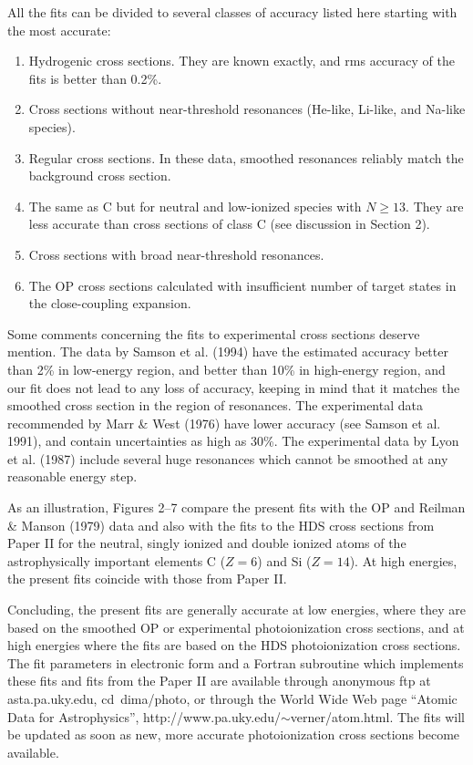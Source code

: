 All the fits can be divided to several classes of accuracy listed here
starting with the most accurate:
\begin{enumerate}
\item[A.] Hydrogenic cross sections. They are known
exactly, and rms accuracy of the fits is better than 0.2\%.
\item[B.] Cross sections without near-threshold resonances (He-like, Li-like,
and Na-like species).
\item[C.] Regular cross sections. In these data,
smoothed resonances reliably match the background cross section.
\item[D.] The same as C but for neutral and low-ionized species with 
$N \ge 13$. They are less accurate
than cross sections of class C (see discussion in Section 2).
\item[E.] Cross sections with broad near-threshold resonances.
\item[F.] The OP cross sections calculated with insufficient number of
target states in the close-coupling expansion.
\end{enumerate}
Some comments concerning the fits to experimental
cross sections
deserve mention. The  data by 
Samson et al. (1994) 
have the 
estimated accuracy
better than 2\% in low-energy region, and better than 10\% in high-energy
region, and our fit does not lead to any loss of accuracy, keeping in
mind that it matches the smoothed cross section in the region of resonances.
The  experimental data recommended by 
Marr \& West (1976) have
lower accuracy (see 
Samson et al. 1991), and contain uncertainties as
high as 30\%. The  experimental data by 
Lyon et al. (1987) include
several huge resonances which cannot be smoothed at any reasonable energy
step.

As an illustration, Figures 2--7 compare the present fits with the OP and 
Reilman \& Manson (1979) data and also with the fits to the HDS cross sections 
from Paper II for the neutral, singly ionized and double ionized atoms of the 
astrophysically important elements C ($Z=6$) and Si ($Z=14$). At high energies,
the present fits coincide with those from Paper II.

Concluding, the present fits are generally accurate at low energies, where 
they are
based on the smoothed
OP or experimental
photoionization cross sections, and at high energies where the fits are
based on the HDS
photoionization cross sections. 
The fit parameters in electronic form and a Fortran subroutine which implements
these fits and fits from the Paper II are available through anonymous ftp at 
asta.pa.uky.edu, 
cd~dima/photo, or through the World Wide Web page ``Atomic Data for 
Astrophysics'', http://www.pa.uky.edu/$\sim$verner/atom.html.
The fits will be updated as soon as new, more accurate photoionization
cross sections become available.

